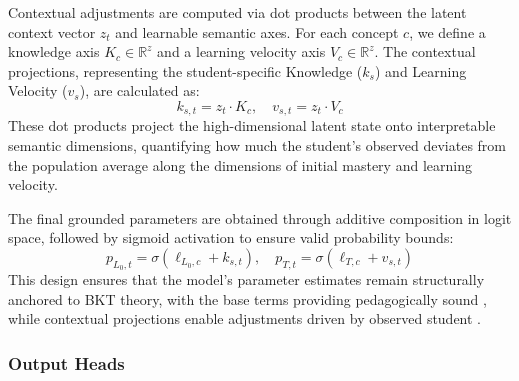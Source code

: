 \documentclass[applsci,article,submit,moreauthors,pdftex]{Definitions/mdpi}
\begin{document}
Contextual adjustments are computed via dot products between the latent context vector $z_t$ and learnable semantic axes. For each concept $c$, we define a knowledge axis $K_{c} \in \mathbb{R}^{z}$ and a learning velocity axis $V_{c} \in \mathbb{R}^{z}$. The contextual projections, representing the student-specific Knowledge ($k_s$) and Learning Velocity ($v_s$), are calculated as:
\begin{equation} \label{eq:contextual_projection}
    k_{s,t} = z_t \cdot K_c, \quad v_{s,t} = z_t \cdot V_c
\end{equation}
These dot products project the high-dimensional latent state onto interpretable semantic dimensions, quantifying how much the student's observed  deviates from the population average along the dimensions of initial mastery and learning velocity.

The final grounded parameters are obtained through additive composition in logit space, followed by sigmoid activation to ensure valid probability bounds:
\begin{equation} \label{eq:grounded_params}
    p_{L_0,t} = \sigma(\ell_{L_0,c} + k_{s,t}), \quad p_{T,t} = \sigma(\ell_{T,c} + v_{s,t})
\end{equation}
This design ensures that the model's parameter estimates remain structurally anchored to BKT theory, with the base terms providing pedagogically sound , while contextual projections enable  adjustments driven by observed student .

\subsubsection{Output Heads} \label{sec_output_heads}
\end{document}
